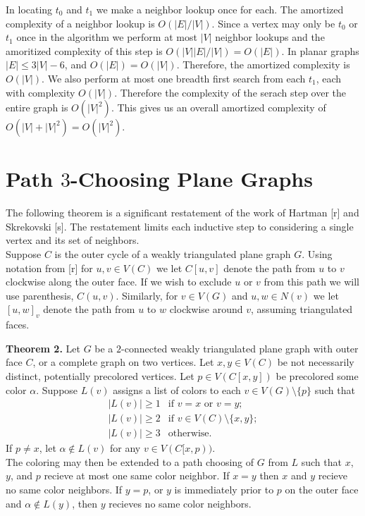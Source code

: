 \documentclass[11pt,letter]{article}
\begin{document}
\noindent In locating $t_0$ and $t_1$ we make a neighbor lookup once for each. The amortized complexity of a
neighbor lookup is $O(|E|/|V|)$. Since a vertex may only be $t_0$
or $t_1$ once in the algorithm we perform at most $|V|$ neighbor lookups and the amoritized complexity
of this step is $O(|V||E|/|V|)=O(|E|)$. In planar graphs $|E|\le 3|V|-6$, and $O(|E|)=O(|V|)$. Therefore, the
amortized complexity is $O(|V|)$. We also perform at most one breadth first
search from each $t_1$, each with complexity $O(|V|)$. Therefore the complexity of the serach step over the
entire graph is $O(|V|^2)$. This gives us an overall amortized complexity of $O(|V|+|V|^2)=O(|V|^2)$.

\section{Path $3$-Choosing Plane Graphs}

The following theorem is a significant restatement of the work of Hartman [r] and Skrekovski [s]. The
restatement limits each inductive step to considering a single vertex and its set of neighbors.\\

\noindent Suppose $C$ is
the outer cycle of a weakly triangulated plane graph $G$. Using notation from [r] for $u,v\in V(C)$ we
let $C[u,v]$ denote the path from $u$ to $v$ clockwise along the outer face. If we wish to exclude $u$ or $v$
from this path we will use parenthesis, $C(u,v)$. Similarly, for $v\in V(G)$ and
$u,w\in N(v)$ we let $[u,w]_v$ denote the path from $u$ to $w$ clockwise around $v$, assuming triangulated
faces.\\

\begin{adjustwidth}{1.5em}{1.5em}
\noindent\textbf{Theorem 2.} Let $G$ be a $2$-connected weakly triangulated plane graph with outer face $C$, or
a complete graph on two vertices. 
Let $x,y\in V(C)$ be not necessarily distinct, potentially precolored vertices. Let $p\in V(C[x,y])$ be precolored some
color $\alpha$. Suppose $L(v)$ assigns a list of colors to each $v\in V(G)\setminus\{p\}$ such that
\[
    \begin{array}{ll}
	    |L(v)|\ge 1 & \text{if } v=x \text{ or } v=y;\\
	    |L(v)|\ge 2 & \text{if } v\in V(C)\setminus\{x,y\};\\
	    |L(v)|\ge 3 & \text{otherwise.}
    \end{array}
\]
If $p\ne x$, let $\alpha\not\in L(v)$ for
any $v\in V(C[x,p))$.\\

\noindent The coloring may then be extended to
a path choosing of $G$ from $L$ such that $x$, $y$, and $p$ recieve at most one same color neighbor. If
$x=y$ then $x$ and $y$ recieve no same color neighbors. If $y=p$, or $y$ is immediately prior to
$p$ on the outer face and $\alpha\not\in L(y)$, then $y$ recieves no same color neighbors.\\
\end{adjustwidth}
\end{document}
